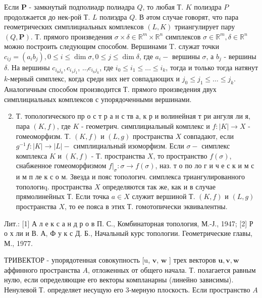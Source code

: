 \documentclass[10pt]{article}
\begin{document}
Если $\boldsymbol{P}$ - замкнутый подполиәдр полиәдра $Q$, то любая Т. $K$ полиэдра $P$ продолжается до нек-рой Т. $L$ полиэдра $Q$. В әтом случае говорят, что пара геометрических симплициальных комплексов $(L, K)$ триангулирует пару $(Q, \boldsymbol{P})$. Т. прямого произведения $\sigma \times \delta \in \mathbb{R}^{m} \times \mathbb{R}^{n}$ симплексов $\sigma \in \mathbb{R}^{m}, \delta \in \mathbb{R}^{n}$ можно построить следующим способом. Вершинами T. служат точки $c_{i j}=\left(a_{i} b_{j}\right), 0 \leqslant i \leqslant \operatorname{dim} \sigma, 0 \leqslant j \leqslant \operatorname{dim} \delta$, где $a_{i}-$ вершины $\sigma$, а $b_{j}$ - вершины $\delta$. На вершины $c_{i_{0} j_{0}}, c_{i_{1} j_{1}}$, ..,$c_{i_{k} j_{k}}$, где $i_{0} \leqslant i_{1} \leqslant \ldots \leqslant i_{k}$, тогда и только тогда натянут $k$-мерный симплекс, когда среди них нет совпадающих и $j_{0} \leqslant j_{1} \leqslant \ldots \leqslant j_{k}$. Аналогичным способом производится Т. прямого произведения двух симплициальных комплексов с упорядоченными вершинами.



\begin{enumerate}

  \setcounter{enumi}{1}

  \item Т. топологического пр о с т р а н с тв а, к р и волинейная т ри ангуля ли я, пара $(K, f)$, где $K$ - геометрич. симплициальный комплекс и $f:|K| \rightarrow X$ - гомеоморфизм. Т. $(K, f)$ и $(L, g)$ пространства $X$ совпадают, если $g^{-1} f:|K| \rightarrow|L|-$ симплициальный изоморфизм. Если $\sigma-$ симплекс комплекса $K$ и $(K, f)$ - Т. пространства $X$, то пространство $f(\sigma)$, снабженное гомеоморфизмом $\left.f\right|_{\sigma}: \sigma \rightarrow f(\sigma)$, наз. т о по ло г и ч е с к и м с и м п ле к с о м. Звезда и пояс топологич. симплекса триангулированного топологиq. пространства $X$ определяются так же, как и в случае прямолинейных Т. Если точка $a \in X$ служит вершиной Т. $(K, f)$ и $(L, g)$ пространства $X$, то ее пояса в этих Т. гомотопически эквивалентны.

\end{enumerate}



Лит.: [1] А л е к с а н д р о в П. С., Комбинаторная топология, М.-Ј., 1947; [2] Р о х ли и В. А, Ф у к с Д. Б., Начальный курс топологии. Геометрические главы, М., 1977.



ТРИВЕКТОР - упорядотенная совокупность [u, $\boldsymbol{v}$, $\boldsymbol{w}$ ] трех векторов $\boldsymbol{u}, \boldsymbol{v}, \boldsymbol{w}$ аффинного пространства $A$, отложенных от общего начала. Т. полагается равным нулю, если определяющие его векторы компланарны (линейно зависимы). Ненулевой Т. определяет несущую его 3-мерную плоскость. Если пространство $A$
\end{document}
